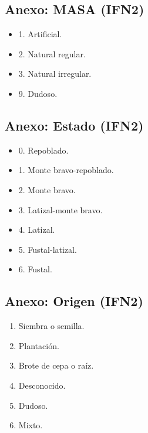 \subsection{Anexo: MASA (IFN2)}\label{sec:masIFN2}
\begin{itemize}
    \item 1. Artificial.
    \item 2. Natural regular.
    \item 3. Natural irregular.
    \item 9. Dudoso.
\end{itemize}

\subsection{Anexo: Estado (IFN2)}\label{sec:EstadoIFN2}
\begin{itemize}
    \item 0. Repoblado. 
    \item 1. Monte bravo-repoblado. 
    \item 2. Monte bravo. 
    \item 3. Latizal-monte bravo. 
    \item 4. Latizal.
    \item 5. Fustal-latizal. 
    \item 6. Fustal.
\end{itemize}

\subsection{Anexo: Origen (IFN2)}\label{sec:OrigenIFN2}
\begin{enumerate}
    \item Siembra o semilla. 
    \item Plantación.
    \item Brote de cepa o raíz. 
    \item Desconocido.
    \item Dudoso. 
    \item Mixto.
\end{enumerate}






























